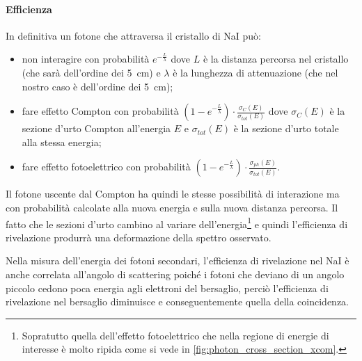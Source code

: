  \paragraph{Efficienza}
 In definitiva un fotone che attraversa il cristallo di NaI può: 
 \begin{itemize}
 	\item non interagire con probabilità $e^{-\frac{L}{\lambda}}$ dove $L$ è la distanza percorsa nel cristallo (che sarà dell'ordine dei \SI{5}{cm}) e $\lambda$ è la lunghezza di attenuazione (che nel nostro caso è dell'ordine dei \SI{5}{cm});
 	\item fare effetto Compton con probabilità $(1-e^{-\frac{L}{\lambda}})\cdot \frac{\sigma_{C}(E)}{\sigma_{tot}(E)}$ dove $\sigma_{C}(E)$ è la sezione d'urto Compton all'energia $E$ e $\sigma_{tot}(E)$ è la sezione d'urto totale alla stessa energia;
 	\item fare effetto fotoelettrico con probabilità $(1-e^{-\frac{L}{\lambda}})\cdot \frac{\sigma_{ph}(E)}{\sigma_{tot}(E)}$.
 \end{itemize}
 Il fotone uscente dal Compton ha quindi le stesse possibilità di interazione ma con probabilità calcolate alla nuova energia e sulla nuova distanza percorsa.
 Il fatto che le sezioni d'urto cambino al variare dell'energia\footnote{Sopratutto quella dell'effetto fotoelettrico che nella regione di energie di interesse è molto ripida come si vede in \autoref{fig:photon_cross_section_xcom}.} e quindi l'efficienza di rivelazione produrrà una deformazione della spettro osservato.
 
 
 Nella misura dell'energia dei fotoni secondari, l'efficienza di rivelazione nel NaI è anche correlata all'angolo di scattering poiché i fotoni che deviano di un angolo piccolo cedono poca energia agli elettroni del bersaglio, perciò l'efficienza di rivelazione nel bersaglio diminuisce e conseguentemente quella della coincidenza.
 
